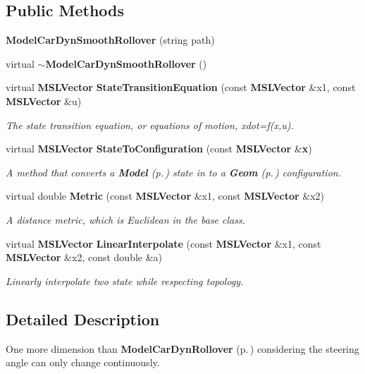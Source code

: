 \subsection*{Public Methods}
\begin{CompactItemize}
\item 
{\bf Model\-Car\-Dyn\-Smooth\-Rollover} (string path)
\item 
virtual {\bf $\sim$Model\-Car\-Dyn\-Smooth\-Rollover} ()
\item 
virtual {\bf MSLVector} {\bf State\-Transition\-Equation} (const {\bf MSLVector} \&x1, const {\bf MSLVector} \&u)
\begin{CompactList}\small\item\em The state transition equation, or equations of motion, xdot=f(x,u).\item\end{CompactList}\item 
virtual {\bf MSLVector} {\bf State\-To\-Configuration} (const {\bf MSLVector} \&{\bf x})
\begin{CompactList}\small\item\em A method that converts a {\bf Model} {\rm (p.\,\pageref{classModel})} state in to a {\bf Geom} {\rm (p.\,\pageref{classGeom})} configuration.\item\end{CompactList}\item 
virtual double {\bf Metric} (const {\bf MSLVector} \&x1, const {\bf MSLVector} \&x2)
\begin{CompactList}\small\item\em A distance metric, which is Euclidean in the base class.\item\end{CompactList}\item 
virtual {\bf MSLVector} {\bf Linear\-Interpolate} (const {\bf MSLVector} \&x1, const {\bf MSLVector} \&x2, const double \&a)
\begin{CompactList}\small\item\em Linearly interpolate two state while respecting topology.\item\end{CompactList}\end{CompactItemize}


\subsection{Detailed Description}
One more dimension than {\bf Model\-Car\-Dyn\-Rollover} {\rm (p.\,\pageref{classModelCarDynRollover})} considering the steering angle can only change continuously.



